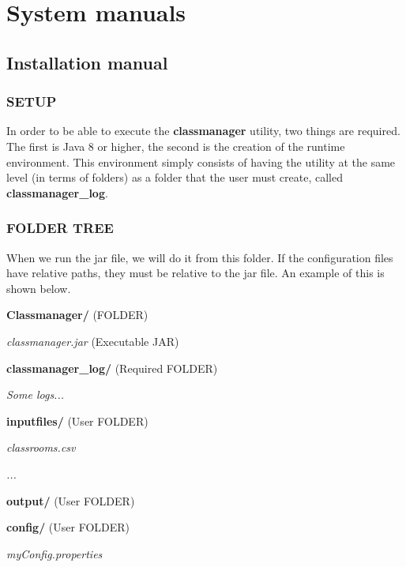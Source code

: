 \renewcommand{\documentname}{System manuals}

\chapter{System manuals}


\section{Installation manual}

\subsection*{SETUP}

In order to be able to execute the \textbf{classmanager} utility, two things are required. The first is Java 8 or higher, the second is the creation of the runtime environment. This environment simply consists of having the utility at the same level (in terms of folders) as a folder that the user must create, called \textbf{classmanager\_log}.

\subsection*{FOLDER TREE}

When we run the jar file, we will do it from this folder. If the configuration files have relative paths, they must be relative to the jar file. An example of this is shown below.

\begin{description}
    \item \textbf{Classmanager/} (FOLDER)
        \begin{description}
            \item \textit{classmanager.jar} (Executable JAR)
            \item \textbf{classmanager\_log/} (Required FOLDER)
                \begin{description}
                    \item \textit{Some logs...}
                \end{description}
            \item \textbf{inputfiles/} (User FOLDER)
                \begin{description}
                    \item \textit{classrooms.csv}
                    \item \textit{...}
                \end{description}
            \item \textbf{output/} (User FOLDER)
            \item \textbf{config/} (User FOLDER)
                \begin{description}
                    \item \textit{myConfig.properties}
                \end{description}
        \end{description}
\end{description}

